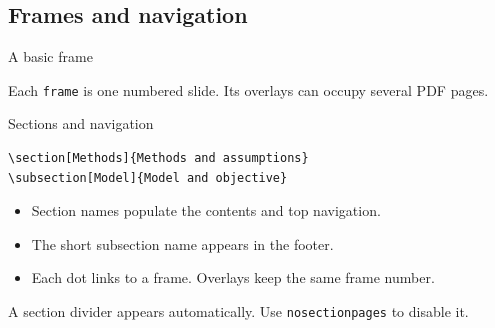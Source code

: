 \documentclass[aspectratio=169,11pt,t,compress]{beamer}
\begin{document}
\subsection[Frames]{Frames and navigation}

\begin{frame}{A basic frame}
  

  \vspace{.25cm}
  Each \texttt{frame} is one numbered slide. Its overlays can occupy several PDF pages.
\end{frame}

\begin{frame}[fragile]{Sections and navigation}
  \begin{lstlisting}
\section[Methods]{Methods and assumptions}
\subsection[Model]{Model and objective}
  \end{lstlisting}

  \vspace{.20cm}
  \begin{itemize}
    \item Section names populate the contents and top navigation.
    \item The short subsection name appears in the footer.
    \item Each dot links to a frame. Overlays keep the same frame number.
  \end{itemize}

  \vspace{.18cm}
  A section divider appears automatically. Use \texttt{nosectionpages} to disable it.
\end{frame}
\end{document}
